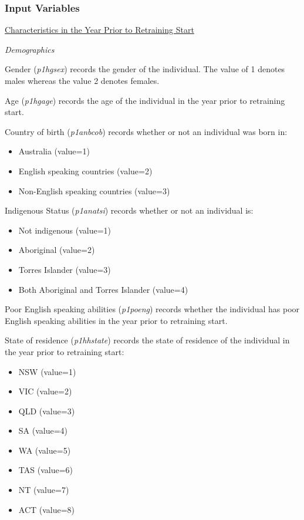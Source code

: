 \documentclass[12pt, a4paper]{article}
\begin{document}
\subsubsection{Input Variables}

\underline{Characteristics in the Year Prior to Retraining Start}

\emph{Demographics}

Gender (\textit{p1\textunderscore{}hgsex}) records the gender of the individual. The value of 1 denotes males whereas the value 2 denotes females. 

Age (\textit{p1\textunderscore{}hgage}) records the age of the individual in the year prior to retraining start.
 
Country of birth (\textit{p1\textunderscore{}anbcob}) records whether or not an individual was born in:
\begin{itemize}
  \item Australia (value=1) 
  \item English speaking countries (value=2)
  \item Non-English speaking countries (value=3)
\end{itemize}  

Indigenous Status (\textit{p1\textunderscore{}anatsi}) records whether or not an individual is:
\begin{itemize}
  \item Not indigenous (value=1)
  \item Aboriginal (value=2)
  \item Torres Islander (value=3)
  \item Both Aboriginal and Torres Islander (value=4) 
\end{itemize}  

Poor English speaking abilities (\textit{p1\textunderscore{}poeng}) records whether the individual has poor English speaking abilities in the year prior to retraining start. 

State of residence (\textit{p1\textunderscore{}hhstate}) records the state of residence of the individual in the year prior to retraining start:
\begin{itemize}
  \item NSW (value=1)
  \item VIC (value=2)
  \item QLD (value=3)
  \item SA (value=4)
  \item WA (value=5)
  \item TAS (value=6)
  \item NT (value=7)
  \item ACT (value=8) 
\end{itemize}  
\end{document}
